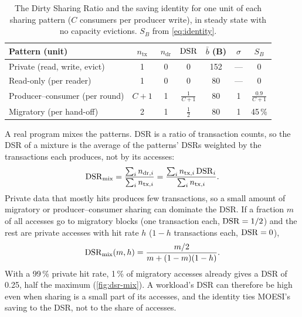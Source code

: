 \begin{table}[htbp]
\centering
\caption{The Dirty Sharing Ratio and the saving identity for one unit of each
sharing pattern ($C$ consumers per producer write), in steady state with no
capacity evictions. $S_B$ from \cref{eq:identity}.}
\label{tab:dsr-patterns}
\small
\begin{tabular}{@{}L{3.1cm} c c c c c c@{}}
\toprule
Pattern (unit) & $n_{\mathrm{tx}}$ & $n_{\mathrm{dr}}$ & $\mathrm{DSR}$ & $\bar b$ (B) &
  $\sigma$ & $S_B$ \\
\midrule
Private (read, write, evict) & 1 & 0 & 0 & 152 & --- & 0 \\
Read-only (per reader) & 1 & 0 & 0 & 80 & --- & 0 \\
Producer--consumer (per round) & $C+1$ & 1 & $\frac{1}{C+1}$ & 80 & 1 &
  $\frac{0.9}{C+1}$ \\
Migratory (per hand-off) & 2 & 1 & $\frac{1}{2}$ & 80 & 1 & 45\,\% \\
\bottomrule
\end{tabular}
\end{table}

A real program mixes the patterns. DSR is a ratio of transaction counts, so the DSR
of a mixture is the average of the patterns' DSRs weighted by the transactions each
produces, not by its accesses:
\begin{equation}
  \mathrm{DSR}_{\mathrm{mix}} = \frac{\sum_i n_{\mathrm{dr},i}}{\sum_i n_{\mathrm{tx},i}}
  = \frac{\sum_i n_{\mathrm{tx},i}\,\mathrm{DSR}_i}{\sum_i n_{\mathrm{tx},i}} .
  \label{eq:dsr-mix}
\end{equation}
Private data that mostly hits produces few transactions, so a small amount of
migratory or producer--consumer sharing can dominate the DSR. If a fraction $m$ of
all accesses go to migratory blocks (one transaction each, $\mathrm{DSR} = 1/2$) and the
rest are private accesses with hit rate $h$ ($1-h$ transactions each, $\mathrm{DSR}=0$),
\begin{equation}
  \mathrm{DSR}_{\mathrm{mix}}(m,h) = \frac{m/2}{m + (1-m)(1-h)} .
  \label{eq:dsr-mix-mig}
\end{equation}
With a 99\,\% private hit rate, 1\,\% of migratory accesses already gives a DSR of
0.25, half the maximum (\cref{fig:dsr-mix}). A workload's DSR can therefore be high
even when sharing is a small part of its accesses, and the identity ties MOESI's
saving to the DSR, not to the share of accesses.

